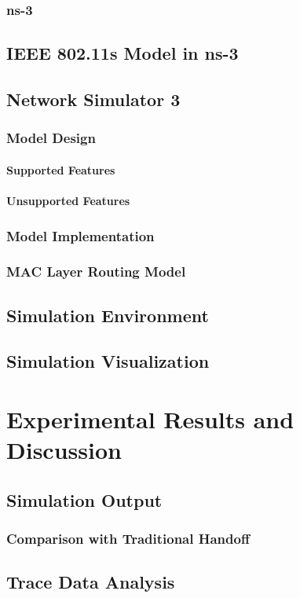 \documentclass[11pt,a4paper]{report}
\begin{document}
\subsection{ns-3}
\section{IEEE 802.11s Model in ns-3}
\section{Network Simulator 3}
\subsection{Model Design}
\subsubsection{Supported Features}
\subsubsection{Unsupported Features}
\subsection{Model Implementation}
\subsection{MAC Layer Routing Model}
\section{Simulation Environment}
\section{Simulation Visualization}

\chapter{Experimental Results and Discussion}
\section{Simulation Output }
\subsection{Comparison with Traditional Handoff}
\section{Trace Data Analysis}
\end{document}
